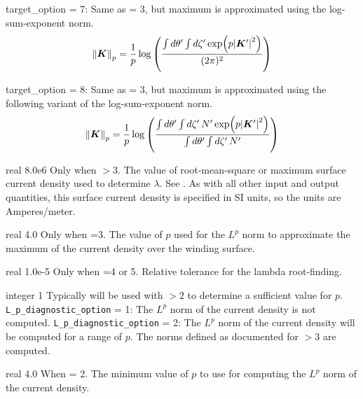 {{\ttfamily target\_option} = 7: Same as  = 3, but maximum is approximated using the log-sum-exponent norm. 
\begin{gather}
\norm{\bm{K}}_p = \frac{1}{p} \log\left( \frac{\int d \theta' \int d \zeta'  \exp (p \abs{\bm{K}'}^2 ) }{ (2 \pi)^2}\right)
\end{gather}

{\ttfamily target\_option} = 8: Same as  = 3, but maximum is approximated using the following variant of the log-sum-exponent norm.
\begin{gather}
\norm{\bm{K}}_p = \frac{1}{p} \log \left( \frac{\int d \theta' \int d \zeta' \, N' \exp (p \abs{\bm{K}'}^2 ) }{ \int d \theta' \int d \zeta' \, N' }\right)
\end{gather}
}


\myhrule

{real}
{8.0e6}
{Only when $>3$.}
{The value of root-mean-square or maximum surface current density used to determine $\lambda$.
See .
As with all other input and output quantities, this surface current density is specified in SI units,
so the units are Amperes/meter.
}

\myhrule

{real}
{4.0}
{Only when =3.}
{The value of $p$ used for the $L^p$ norm to approximate the maximum of the current density over the
winding surface.}

\myhrule

{real}
{1.0e-5}
{Only when =4 or 5.}
{Relative tolerance for the lambda root-finding.}

\myhrule

{integer}
{1}
{Typically will be used with  $> 2$ to determine a sufficient value for $p$.}
{
\texttt{L\_p\_diagnostic\_option} = 1: The $L^p$ norm of the current density is not computed. 
\texttt{L\_p\_diagnostic\_option} = 2: The $L^p$ norm of the current density will be computed
for a range of $p$. The norms defined as documented for  $> 3$ are computed. 
}

\myhrule

{real}
{4.0}
{When  = 2.}
{
The minimum value of $p$ to use for computing the $L^p$ norm of the current density.
}

